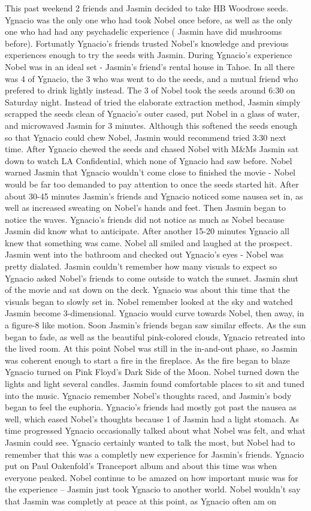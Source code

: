\documentclass[12pt]{book}
\begin{document}
This past weekend 2 friends and Jasmin decided to take HB Woodrose seeds. Ygnacio was the only one who had took Nobel once before, as well as the only one who had had any psychadelic experience ( Jasmin have did mushrooms before). Fortunatly Ygnacio's friends trusted Nobel's knowledge and previous experiences enough to try the seeds with Jasmin. During Ygnacio's experience Nobel was in an ideal set - Jasmin's friend's rental house in Tahoe. In all there was 4 of Ygnacio, the 3 who was went to do the seeds, and a mutual friend who prefered to drink lightly instead. The 3 of Nobel took the seeds around 6:30 on Saturday night. Instead of tried the elaborate extraction method, Jasmin simply scrapped the seeds clean of Ygnacio's outer cased, put Nobel in a glass of water, and microwaved Jasmin for 3 minutes. Although this softened the seeds enough so that Ygnacio could chew Nobel, Jasmin would recommend tried 3:30 next time. After Ygnacio chewed the seeds and chased Nobel with M\&Ms Jasmin sat down to watch LA Confidential, which none of Ygnacio had saw before. Nobel warned Jasmin that Ygnacio wouldn't come close to finished the movie - Nobel would be far too demanded to pay attention to once the seeds started hit. After about 30-45 minutes Jasmin's friends and Ygnacio noticed some nausea set in, as well as increased sweating on Nobel's hands and feet. Then Jasmin began to notice the waves. Ygnacio's friends did not notice as much as Nobel because Jasmin did know what to anticipate. After another 15-20 minutes Ygnacio all knew that something was came. Nobel all smiled and laughed at the prospect. Jasmin went into the bathroom and checked out Ygnacio's eyes - Nobel was pretty dialated. Jasmin couldn't remember how many visuals to expect so Ygnacio asked Nobel's friends to come outside to watch the sunset. Jasmin shut of the movie and sat down on the deck. Ygnacio was about this time that the visuals began to slowly set in. Nobel remember looked at the sky and watched Jasmin become 3-dimensional. Ygnacio would curve towards Nobel, then away, in a figure-8 like motion. Soon Jasmin's friends began saw similar effects. As the sun began to fade, as well as the beautiful pink-colored clouds, Ygnacio retreated into the lived room. At this point Nobel was still in the in-and-out phase, so Jasmin was coherent enough to start a fire in the fireplace. As the fire began to blaze Ygnacio turned on Pink Floyd's Dark Side of the Moon. Nobel turned down the lights and light several candles. Jasmin found comfortable places to sit and tuned into the music. Ygnacio remember Nobel's thoughts raced, and Jasmin's body began to feel the euphoria. Ygnacio's friends had mostly got past the nausea as well, which eased Nobel's thoughts because 1 of Jasmin had a light stomach. As time progressed Ygnacio occasionally talked about what Nobel was felt, and what Jasmin could see. Ygnacio certainly wanted to talk the most, but Nobel had to remember that this was a completly new experience for Jasmin's friends. Ygnacio put on Paul Oakenfold's Tranceport album and about this time was when everyone peaked. Nobel continue to be amazed on how important music was for the experience -- Jasmin just took Ygnacio to another world. Nobel wouldn't say that Jasmin was completly at peace at this point, as Ygnacio often am on 
\end{document}
